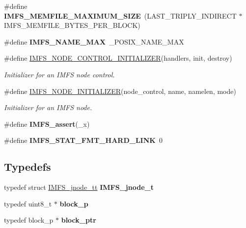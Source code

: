 \begin{DoxyCompactItemize}
\item 
\mbox{\label{group__IMFS_ga640b80cd44d77c044162f5abb6929b8c}} 
\#define {\bfseries I\+M\+F\+S\+\_\+\+M\+E\+M\+F\+I\+L\+E\+\_\+\+M\+A\+X\+I\+M\+U\+M\+\_\+\+S\+I\+ZE}~(L\+A\+S\+T\+\_\+\+T\+R\+I\+P\+L\+Y\+\_\+\+I\+N\+D\+I\+R\+E\+CT $\ast$ I\+M\+F\+S\+\_\+\+M\+E\+M\+F\+I\+L\+E\+\_\+\+B\+Y\+T\+E\+S\+\_\+\+P\+E\+R\+\_\+\+B\+L\+O\+CK)
\item 
\mbox{\label{group__IMFS_gafda6f4a721ad0cd4666ed19c773a6b41}} 
\#define {\bfseries I\+M\+F\+S\+\_\+\+N\+A\+M\+E\+\_\+\+M\+AX}~\+\_\+\+P\+O\+S\+I\+X\+\_\+\+N\+A\+M\+E\+\_\+\+M\+AX
\item 
\#define \mbox{\hyperlink{group__IMFS_ga3003884652843bc2a52af880d6accf4f}{I\+M\+F\+S\+\_\+\+N\+O\+D\+E\+\_\+\+C\+O\+N\+T\+R\+O\+L\+\_\+\+I\+N\+I\+T\+I\+A\+L\+I\+Z\+ER}}(handlers,  init,  destroy)
\begin{DoxyCompactList}\small\item\em Initializer for an I\+M\+FS node control. \end{DoxyCompactList}\item 
\#define \mbox{\hyperlink{group__IMFS_gadf395ed2a459636e9554349d7227da6d}{I\+M\+F\+S\+\_\+\+N\+O\+D\+E\+\_\+\+I\+N\+I\+T\+I\+A\+L\+I\+Z\+ER}}(node\+\_\+control,  name,  namelen,  mode)
\begin{DoxyCompactList}\small\item\em Initializer for an I\+M\+FS node. \end{DoxyCompactList}\item 
\mbox{\label{group__IMFS_ga9bdc04e8634a1ad62a4798ce031effba}} 
\#define {\bfseries I\+M\+F\+S\+\_\+assert}(\+\_\+x)
\item 
\mbox{\label{group__IMFS_gaad079eb4b18c4fb6aca63ccbc71ba298}} 
\#define {\bfseries I\+M\+F\+S\+\_\+\+S\+T\+A\+T\+\_\+\+F\+M\+T\+\_\+\+H\+A\+R\+D\+\_\+\+L\+I\+NK}~0
\end{DoxyCompactItemize}
\subsection*{Typedefs}
\begin{DoxyCompactItemize}
\item 
\mbox{\label{group__IMFS_ga9553162b3894c6058633b73471dc0e2c}} 
typedef struct \mbox{\hyperlink{structIMFS__jnode__tt}{I\+M\+F\+S\+\_\+jnode\+\_\+tt}} {\bfseries I\+M\+F\+S\+\_\+jnode\+\_\+t}
\item 
\mbox{\label{group__IMFS_gaa2758b6427f32cb4817fbd62d87398d7}} 
typedef uint8\+\_\+t $\ast$ {\bfseries block\+\_\+p}
\item 
\mbox{\label{group__IMFS_gafd4f22241023d313146fa11f4b328a65}} 
typedef block\+\_\+p $\ast$ {\bfseries block\+\_\+ptr}
\end{DoxyCompactItemize}
